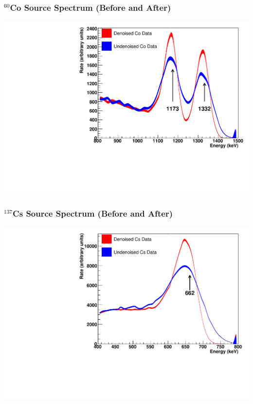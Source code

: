 \documentclass{beamer}
\begin{document}
\begin{frame}
\begin{center}
\frametitle{$^{60}$Co Source Spectrum (Before and After)}
\end{center}
\vspace{1cm}
\begin{center}
\includegraphics[keepaspectratio=true,width=\textwidth]{CoSourceSpectrumComparison.pdf}
\end{center}
\end{frame}

\begin{frame}
\begin{center}
\frametitle{$^{137}$Cs Source Spectrum (Before and After)}
\end{center}
\vspace{1cm}
\begin{center}
\includegraphics[keepaspectratio=true,width=\textwidth]{CsSourceSpectrumComparison.pdf}
\end{center}
\end{frame}
\end{document}

